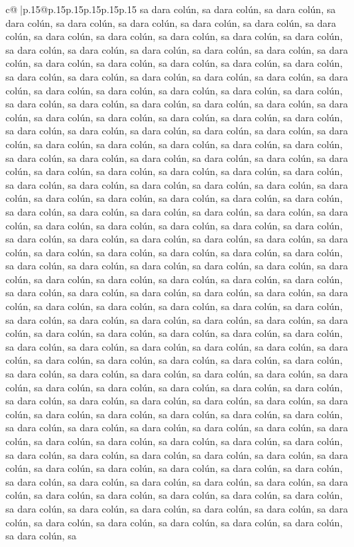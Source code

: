 \documentclass{article}
\begin{document}
{\begin{supertabular}{c@{$\;$}|p{.15\linewidth}@{}p{.15\linewidth}p{.15\linewidth}p{.15\linewidth}p{.15\linewidth}p{.15\linewidth}}
{{{sa dara colún, sa dara colún, sa dara colún, sa dara colún, sa dara colún, sa dara colún, sa dara colún, sa dara colún, sa dara colún, sa dara colún, sa dara colún, sa dara colún, sa dara colún, sa dara colún, sa dara colún, sa dara colún, sa dara colún, sa dara colún, sa dara colún, sa dara colún, sa dara colún, sa dara colún, sa dara colún, sa dara colún, sa dara colún, sa dara colún, sa dara colún, sa dara colún, sa dara colún, sa dara colún, sa dara colún, sa dara colún, sa dara colún, sa dara colún, sa dara colún, sa dara colún, sa dara colún, sa dara colún, sa dara colún, sa dara colún, sa dara colún, sa dara colún, sa dara colún, sa dara colún, sa dara colún, sa dara colún, sa dara colún, sa dara colún, sa dara colún, sa dara colún, sa dara colún, sa dara colún, sa dara colún, sa dara colún, sa dara colún, sa dara colún, sa dara colún, sa dara colún, sa dara colún, sa dara colún, sa dara colún, sa dara colún, sa dara colún, sa dara colún, sa dara colún, sa dara colún, sa dara colún, sa dara colún, sa dara colún, sa dara colún, sa dara colún, sa dara colún, sa dara colún, sa dara colún, sa dara colún, sa dara colún, sa dara colún, sa dara colún, sa dara colún, sa dara colún, sa dara colún, sa dara colún, sa dara colún, sa dara colún, sa dara colún, sa dara colún, sa dara colún, sa dara colún, sa dara colún, sa dara colún, sa dara colún, sa dara colún, sa dara colún, sa dara colún, sa dara colún, sa dara colún, sa dara colún, sa dara colún, sa dara colún, sa dara colún, sa dara colún, sa dara colún, sa dara colún, sa dara colún, sa dara colún, sa dara colún, sa dara colún, sa dara colún, sa dara colún, sa dara colún, sa dara colún, sa dara colún, sa dara colún, sa dara colún, sa dara colún, sa dara colún, sa dara colún, sa dara colún, sa dara colún, sa dara colún, sa dara colún, sa dara colún, sa dara colún, sa dara colún, sa dara colún, sa dara colún, sa dara colún, sa dara colún, sa dara colún, sa dara colún, sa dara colún, sa dara colún, sa dara colún, sa dara colún, sa dara colún, sa dara colún, sa dara colún, sa dara colún, sa dara colún, sa dara colún, sa dara colún, sa dara colún, sa dara colún, sa dara colún, sa dara colún, sa dara colún, sa dara colún, sa dara colún, sa dara colún, sa dara colún, sa dara colún, sa dara colún, sa dara colún, sa dara colún, sa dara colún, sa dara colún, sa dara colún, sa dara colún, sa dara colún, sa dara colún, sa dara colún, sa dara colún, sa dara colún, sa dara colún, sa dara colún, sa dara colún, sa dara colún, sa dara colún, sa dara colún, sa dara colún, sa dara colún, sa dara colún, sa dara colún, sa dara colún, sa dara colún, sa dara colún, sa dara colún, sa dara colún, sa dara colún, sa dara colún, sa dara colún, sa dara colún, sa dara colún, sa dara colún, sa dara colún, sa dara colún, sa dara colún, sa dara colún, sa dara colún, sa dara colún, sa dara colún, sa dara colún, sa dara colún, sa dara colún, sa dara colún, sa dara colún, sa dara colún, sa dara colún, sa dara colún, sa dara colún, sa dara colún, sa dara colún, sa dara colún, sa dara colún, sa dara colún, sa dara colún, sa dara colún, sa dara colún, sa dara colún, sa dara colún, sa dara colún, sa dara colún, sa dara colún, sa }}}
\end{supertabular}}
\end{document}
